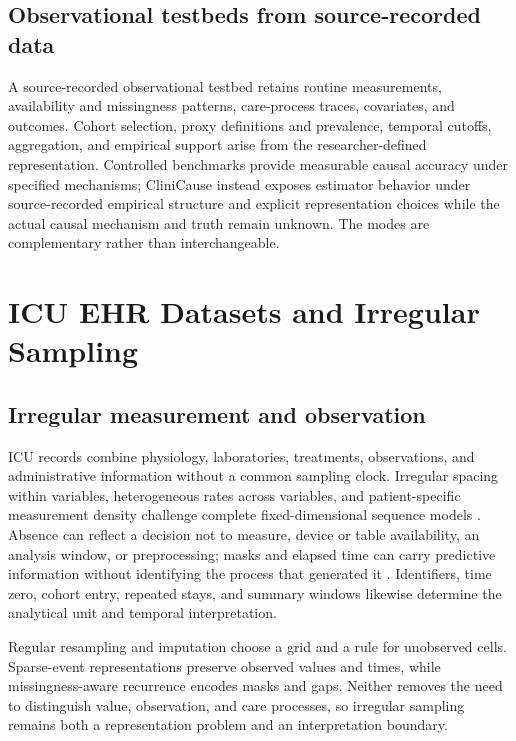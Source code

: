 \subsection{Observational testbeds from source-recorded data}

A source-recorded observational testbed retains routine measurements, availability and missingness patterns, care-process traces, covariates, and outcomes.  Cohort selection, proxy definitions and prevalence, temporal cutoffs, aggregation, and empirical support arise from the researcher-defined representation.  Controlled benchmarks provide measurable causal accuracy under specified mechanisms; CliniCause instead exposes estimator behavior under source-recorded empirical structure and explicit representation choices while the actual causal mechanism and truth remain unknown.  The modes are complementary rather than interchangeable.

\section{ICU EHR Datasets and Irregular Sampling}
\label{sec:background-related-work:icu-ehr-datasets-irregular-sampling}

\subsection{Irregular measurement and observation}

ICU records combine physiology, laboratories, treatments, observations, and administrative information without a common sampling clock.  Irregular spacing within variables, heterogeneous rates across variables, and patient-specific measurement density challenge complete fixed-dimensional sequence models \cite{sun_2026_review_irregular_medical_timeseries}.  Absence can reflect a decision not to measure, device or table availability, an analysis window, or preprocessing; masks and elapsed time can carry predictive information without identifying the process that generated it \cite{che2018grud}.  Identifiers, time zero, cohort entry, repeated stays, and summary windows likewise determine the analytical unit and temporal interpretation.

Regular resampling and imputation choose a grid and a rule for unobserved cells.  Sparse-event representations preserve observed values and times, while missingness-aware recurrence encodes masks and gaps.  Neither removes the need to distinguish value, observation, and care processes, so irregular sampling remains both a representation problem and an interpretation boundary.

